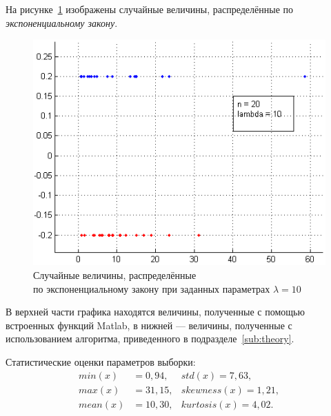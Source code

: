 На рисунке~\ref{pic:exp} изображены случайные величины, распределённые
по \textit{экспоненциальному закону}.
\begin{figure}[h!]
  \centering
  \includegraphics[width=0.9\linewidth]{pic/exp}
  \caption{Случайные величины, распределённые \\ по экспоненциальному закону при заданных параметрах $ \lambda = 10 $}
  \label{pic:exp}
\end{figure}

В верхней части графика находятся величины, полученные с помощью
встроенных функций Matlab, в нижней --- величины, полученные
с использованием алгоритма, приведенного в подразделе~\ref{sub:theory}.

Статистические оценки параметров выборки:
\begin{align*}
  min (x)  &= 0{,}94,  & std (x) = 7{,}63, \\
  max (x)  &= 31{,}15, & skewness (x) = 1{,}21, \\
  mean (x) &= 10{,}30, & kurtosis (x) = 4{,}02.
\end{align*}

\newpage
